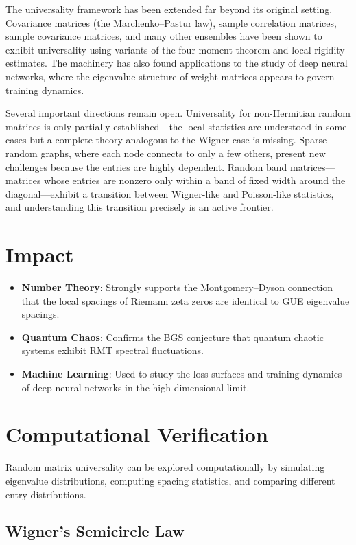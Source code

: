The universality framework has been extended far beyond its original setting. Covariance matrices (the Marchenko--Pastur law), sample correlation matrices, sample covariance matrices, and many other ensembles have been shown to exhibit universality using variants of the four-moment theorem and local rigidity estimates. The machinery has also found applications to the study of deep neural networks, where the eigenvalue structure of weight matrices appears to govern training dynamics.

Several important directions remain open. Universality for non-Hermitian random matrices is only partially established---the local statistics are understood in some cases but a complete theory analogous to the Wigner case is missing. Sparse random graphs, where each node connects to only a few others, present new challenges because the entries are highly dependent. Random band matrices---matrices whose entries are nonzero only within a band of fixed width around the diagonal---exhibit a transition between Wigner-like and Poisson-like statistics, and understanding this transition precisely is an active frontier.

\section{Impact}
\begin{itemize}
\item \textbf{Number Theory}: Strongly supports the Montgomery--Dyson connection that the local spacings of Riemann zeta zeros are identical to GUE eigenvalue spacings.
\item \textbf{Quantum Chaos}: Confirms the BGS conjecture that quantum chaotic systems exhibit RMT spectral fluctuations.
\item \textbf{Machine Learning}: Used to study the loss surfaces and training dynamics of deep neural networks in the high-dimensional limit.
\end{itemize}

\section{Computational Verification}

Random matrix universality can be explored computationally by simulating eigenvalue distributions, computing spacing statistics, and comparing different entry distributions.

\subsection{Wigner's Semicircle Law}

